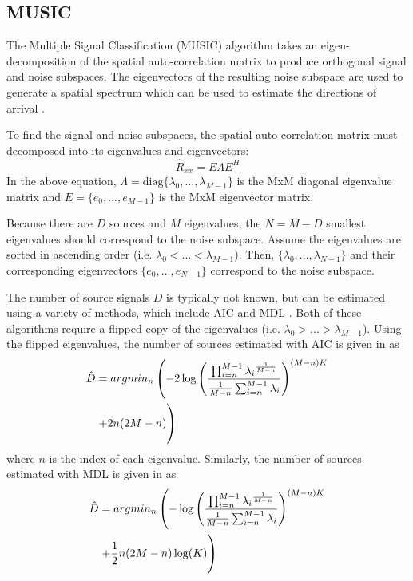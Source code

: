\documentclass[conference]{IEEEtran}
\begin{document}
	\subsection{MUSIC}
	
		The Multiple Signal Classification (MUSIC) algorithm takes an eigen-decomposition of the spatial auto-correlation matrix to produce orthogonal signal and noise subspaces. The eigenvectors of the resulting noise subspace are used to generate a spatial spectrum which can be used to estimate the directions of arrival \cite{doa_algorithms_raghu}.
	
		To find the signal and noise subspaces, the spatial auto-correlation matrix must decomposed into its eigenvalues and eigenvectors:
	\begin{equation}
		\hat{R}_{xx} = E{\Lambda}E^H
		\label{eigenvalue_decomposition_of_Rxx}
	\end{equation}
	In the above equation, $\Lambda = \text{diag}\{\lambda_0,...,\lambda_{M-1}\}$ is the MxM diagonal eigenvalue matrix and $E=\{e_0,...,e_{M-1}\}$ is the MxM eigenvector matrix.
	
	Because there are $D$ sources and $M$ eigenvalues, the $N = M - D$ smallest eigenvalues should correspond to the noise subspace. Assume the eigenvalues are sorted in ascending order (i.e. $\lambda_0 < ... < \lambda_{M-1}$). Then, $\{\lambda_0,...,\lambda_{N-1}\}$ and their corresponding eigenvectors $\{e_0,...,e_{N-1}\}$ correspond to the noise subspace.
	
	The number of source signals $D$ is typically not known, but can be estimated using a variety of methods, which include AIC and MDL \cite{num_sources_est_salman}. Both of these algorithms require a flipped copy of the eigenvalues (i.e. $\lambda_0 > ... > \lambda_{M-1}$). Using the flipped eigenvalues, the number of sources estimated with AIC is given in \cite{num_sources_est_salman} as
	\begin{equation}
		\begin{split}
		\hat{D} &= argmin_n\left(-2\log\left(\frac{\prod_{i=n}^{M-1}{{\lambda_i}^{\frac{1}{M-n}}}}{\frac{1}{M - n}\sum_{i=n}^{M-1}{\lambda_i}}\right)^{(M-n)K}\right. \\
		& \left. + 2n(2M - n) \vphantom{-2\log\left(\frac{\prod_{i=n}^{M-1}{{\lambda_i}^{\frac{1}{M-k}}}}{\frac{1}{M - n}\sum_{i=n}^{M-1}{\lambda_i}}\right)^{(M-n)K}} \right)
		\end{split}
		\label{AIC_num_sources}
	\end{equation}
	where $n$ is the index of each eigenvalue. Similarly, the number of sources estimated with MDL is given in \cite{num_sources_est_salman} as
	\begin{equation}
		\begin{split}
		\hat{D} &= argmin_n\left(-\log\left(\frac{\prod_{i=n}^{M-1}{{\lambda_i}^{\frac{1}{M-n}}}}{\frac{1}{M - n}\sum_{i=n}^{M-1}{\lambda_i}}\right)^{(M-n)K}\right. \\
		& \left. + \frac{1}{2}n(2M - n)\log(K) \vphantom{-\log\left(\frac{\prod_{i=n}^{M-1}{{\lambda_i}^{\frac{1}{M-k}}}}{\frac{1}{M - n}\sum_{i=n}^{M-1}{\lambda_i}}\right)^{(M-n)K}} \right)
		\end{split}
		\label{MDL_num_sources}
	\end{equation}
	
\end{document}
